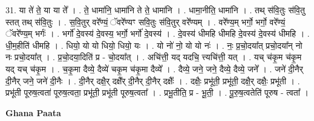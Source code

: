 \documentclass[17pt]{extarticle}
\begin{document}
31. या ते॑ ते॒ या या ते᳚ । . ते॒ धामा॑नि॒ धामा॑नि ते ते॒ धामा॑नि । . धामा॒नीति॒ धामा॑नि । . तथ् स॑वि॒तुः स॑वि॒तु स्तत् तथ् स॑वि॒तुः । . स॒वि॒तुर् वरे᳚ण्यं॒ ॅवरे᳚ण्यꣳ सवि॒तुः स॑वि॒तुर् वरे᳚ण्यम् । . वरे᳚ण्य॒म् भर्गो॒ भर्गो॒ वरे᳚ण्यं॒ ॅवरे᳚ण्य॒म् भर्गः॑ । . भर्गो॑ दे॒वस्य॑ दे॒वस्य॒ भर्गो॒ भर्गो॑ दे॒वस्य॑ । . दे॒वस्य॑ धीमहि धीमहि दे॒वस्य॑ दे॒वस्य॑ धीमहि । . धी॒म॒हीति॑ धीमहि । . धियो॒ यो यो धियो॒ धियो॒ यः । . यो नो॑ नो॒ यो यो नः॑ । . नः॒ प्र॒चो॒दया᳚त् प्रचो॒दया᳚न् नो नः प्रचो॒दया᳚त् । . प्र॒चो॒दया॒दिति॑ प्र - चो॒दया᳚त् । . अचि॑त्ती॒ यद् यदचि॒ त्त्यचि॑त्ती॒ यत् । . यच् च॑कृ॒म च॑कृ॒म यद् यच् च॑कृ॒म । . च॒कृ॒मा दैव्ये॒ दैव्ये॑ चकृ॒म च॑कृ॒मा दैव्ये᳚ । . दैव्ये॒ जने॒ जने॒ दैव्ये॒ दैव्ये॒ जने᳚ । . जने॑ दी॒नैर् दी॒नैर् जने॒ जने॑ दी॒नैः । . दी॒नैर् दक्षै॒र् दक्षै᳚र् दी॒नैर् दी॒नैर् दक्षैः᳚ । . दक्षैः॒ प्रभू॑ती॒ प्रभू॑ती॒ दक्षै॒र् दक्षैः॒ प्रभू॑ती । . प्रभू॑ती पूरुष॒त्वता॑ पूरुष॒त्वता॒ प्रभू॑ती॒ प्रभू॑ती पूरुष॒त्वता᳚ । . प्रभू॒तीति॒ प्र - भू॒ती॒ । . पू॒रु॒ष॒त्वतेति॑ पूरुष - त्वता᳚ । \newline

\textbf{Ghana Paata } \newline
\end{document}
